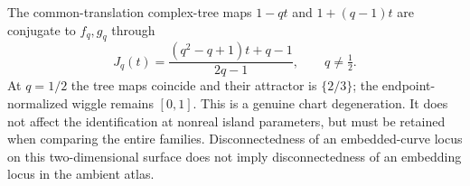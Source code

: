 The common-translation complex-tree maps $1-qt$ and $1+(q-1)t$
are conjugate to $f_q,g_q$ through
\[
J_q(t)=\frac{(q^2-q+1)t+q-1}{2q-1},\qquad q\ne\tfrac12.
\]
At $q=1/2$ the tree maps coincide and their attractor is
$\{2/3\}$; the endpoint-normalized wiggle remains $[0,1]$.
This is a genuine chart degeneration. It does not affect the
identification at nonreal island parameters, but must be retained
when comparing the entire families. Disconnectedness of an
embedded-curve locus on this two-dimensional surface does not
imply disconnectedness of an embedding locus in the ambient atlas.



